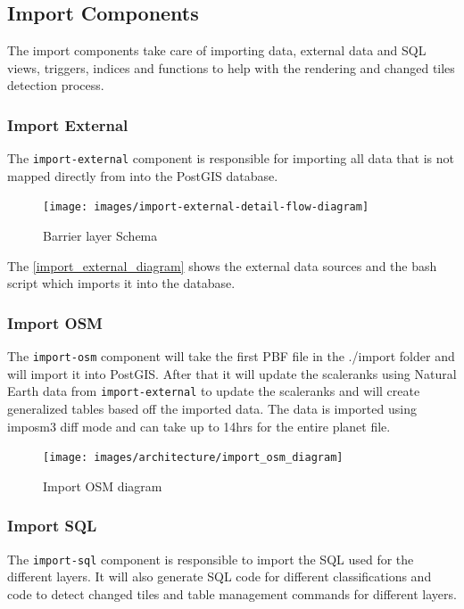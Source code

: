 \subsection{Import Components}

The import components take care of importing \osm{} data, external data and SQL views, triggers, indices and functions to help with the rendering and changed tiles detection process.

\subsubsection{Import External}

The \texttt{import-external} component is responsible for importing all data that is not mapped directly from \osm{} into the PostGIS database.

\begin{figure}[H]
  \centering
  \texttt{[image: images/import-external-detail-flow-diagram]}
  \caption{Barrier layer Schema}
  \label{import_external_diagram} 
\end{figure}

The \autoref{import_external_diagram} shows the external data sources and the bash script which imports it into the database.

\subsubsection{Import OSM}

The \texttt{import-osm} component will take the first PBF file in the ./import folder and will import it into PostGIS. After that it will update the scaleranks using Natural Earth data from \texttt{import-external} to update the scaleranks and will create generalized tables based off the imported data. The data is imported using imposm3 diff mode and can take up to 14hrs for the entire planet file.

\begin{figure}[H]
  \centering
  \texttt{[image: images/architecture/import\_osm\_diagram]}
  \caption{Import OSM diagram}
\end{figure}

\subsubsection{Import SQL}

The \texttt{import-sql} component is responsible to import the SQL used for the different layers. It will also generate SQL code for different classifications and code to detect changed tiles and table management commands for different layers.

